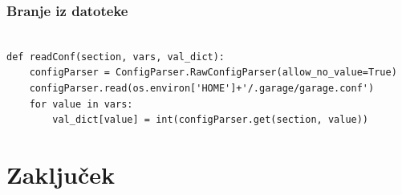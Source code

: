 \documentclass[11pt]{article}
\begin{document}
\subsubsection{Branje iz datoteke}
\begin{verbatim}
  
def readConf(section, vars, val_dict):
    configParser = ConfigParser.RawConfigParser(allow_no_value=True)
    configParser.read(os.environ['HOME']+'/.garage/garage.conf')
    for value in vars:
        val_dict[value] = int(configParser.get(section, value))
\end{verbatim}
\newpage
\section{Zaključek}
\newpage
\clearpage
 
\printglossary[type=\acronymtype]
 
\printglossary[type=main]

\newpage

\begin{flushleft}



\end{flushleft}
\end{document}
